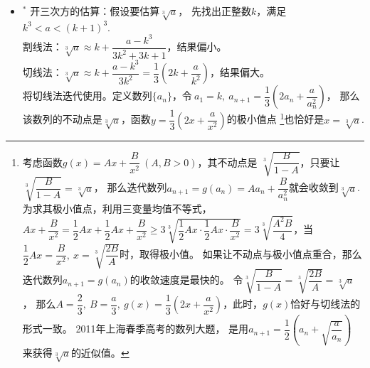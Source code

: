 \begin{itemize}[leftmargin=\inteval{\myitemleftmargin}pt,itemsep=
   \inteval{\myitemitempsep}pt,topsep=\inteval{\myitemtopsep}pt]
\item $^*$ 开三次方的估算：假设要估算$ \sqrt[3]{a} $，
先找出正整数$ k $，满足$ k^3<a<(k+1)^3 $. \\
割线法：$ \sqrt[3]{a}\approx k+\dfrac{a-k^3}{3k^2+3k+1} $，结果偏小。 	\\
切线法：$ \sqrt[3]{a}\approx k+\dfrac{a-k^3}{3k^2}=\dfrac{1}{3}\left(2k+\dfrac{a}{k^2}\right) $，结果偏大。\\
将切线法迭代使用。定义数列$ \{a_n\} $，令$\ a_1=k,\ a_{n+1}=\dfrac{1}{3}\left(2a_n+\dfrac{a}{a_n^2}\right) $，
那么该数列的不动点是$ \sqrt[3]{a} $，函数$ y=\dfrac{1}{3}\left(2x+\dfrac{a}{x^2}\right) $的极小值点
\footnote{考虑函数$ g(x)=Ax+\dfrac{B}{x^2}\ (A,B>0) $，其不动点是
$ \sqrt[3]{\dfrac{B}{1-A}} $，只要让$ \sqrt[3]{\dfrac{B}{1-A}}=\sqrt[3]{a} $，
那么迭代数列$ a_{n+1}=g(a_n)=Aa_n+\dfrac{B}{a_n^2} $就会收敛到$ \sqrt[3]{a} $.
为求其极小值点，利用三变量均值不等式，
$ Ax+\dfrac{B}{x^2}=\dfrac{1}{2}Ax+\dfrac{1}{2}Ax+\dfrac{B}{x^2}\geq 
3\sqrt[3]{\dfrac{1}{2}Ax\cdot\dfrac{1}{2}Ax\cdot\dfrac{B}{x^2}}=3\sqrt[3]{
    \dfrac{A^2B}{4}} $，当$ \dfrac{1}{2}Ax=\dfrac{B}{x^2},\ x=\sqrt[3]{
    \dfrac{2B}{A}} $时，取得极小值。
如果让不动点与极小值点重合，那么迭代数列$ a_{n+1}=g(a_n) $的收敛速度是最快的。
令$ \sqrt[3]{\dfrac{B}{1-A}}=\sqrt[3]{\dfrac{2B}{A}}=\sqrt[3]{a} $，
那么$ A=\dfrac{2}{3},\ B=\dfrac{a}{3},\ g(x)=\dfrac{1}{3}\left(
2x+\dfrac{a}{x^2}\right) $，此时，$ g(x) $恰好与切线法的形式一致。
2011年上海春季高考的数列大题，
是用$ a_{n+1}=\dfrac{1}{2}\left(a_n+\sqrt{\dfrac{a}{a_n}}\right) $
来获得$ \sqrt[3]{a} $的近似值。}也恰好是$ x=\sqrt[3]{a} $.
    


\end{itemize}

